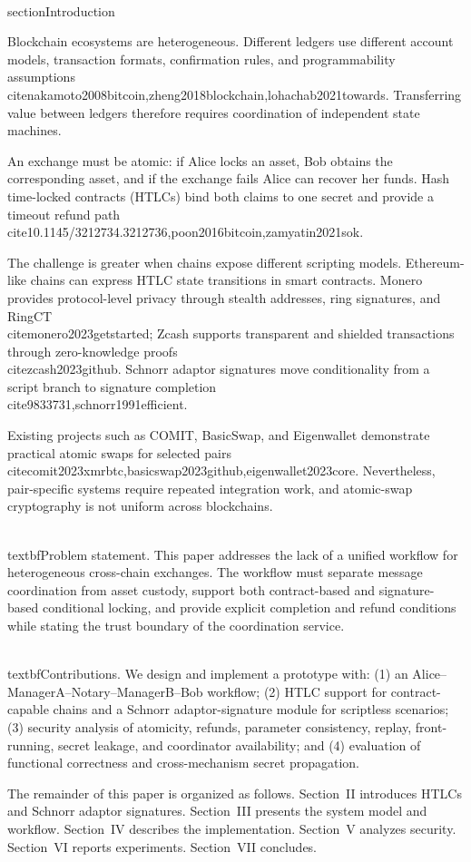 \\section{Introduction}

Blockchain ecosystems are heterogeneous. Different ledgers use different account models, transaction formats, confirmation rules, and programmability assumptions~\\cite{nakamoto2008bitcoin,zheng2018blockchain,lohachab2021towards}. Transferring value between ledgers therefore requires coordination of independent state machines.

An exchange must be atomic: if Alice locks an asset, Bob obtains the corresponding asset, and if the exchange fails Alice can recover her funds. Hash time-locked contracts (HTLCs) bind both claims to one secret and provide a timeout refund path~\\cite{10.1145/3212734.3212736,poon2016bitcoin,zamyatin2021sok}.

The challenge is greater when chains expose different scripting models. Ethereum-like chains can express HTLC state transitions in smart contracts. Monero provides protocol-level privacy through stealth addresses, ring signatures, and RingCT~\\cite{monero2023getstarted}; Zcash supports transparent and shielded transactions through zero-knowledge proofs~\\cite{zcash2023github}. Schnorr adaptor signatures move conditionality from a script branch to signature completion~\\cite{9833731,schnorr1991efficient}.

Existing projects such as COMIT, BasicSwap, and Eigenwallet demonstrate practical atomic swaps for selected pairs~\\cite{comit2023xmrbtc,basicswap2023github,eigenwallet2023core}. Nevertheless, pair-specific systems require repeated integration work, and atomic-swap cryptography is not uniform across blockchains.

\\textbf{Problem statement.} This paper addresses the lack of a unified workflow for heterogeneous cross-chain exchanges. The workflow must separate message coordination from asset custody, support both contract-based and signature-based conditional locking, and provide explicit completion and refund conditions while stating the trust boundary of the coordination service.

\\textbf{Contributions.} We design and implement a prototype with: (1) an Alice--ManagerA--Notary--ManagerB--Bob workflow; (2) HTLC support for contract-capable chains and a Schnorr adaptor-signature module for scriptless scenarios; (3) security analysis of atomicity, refunds, parameter consistency, replay, front-running, secret leakage, and coordinator availability; and (4) evaluation of functional correctness and cross-mechanism secret propagation.

The remainder of this paper is organized as follows. Section~II introduces HTLCs and Schnorr adaptor signatures. Section~III presents the system model and workflow. Section~IV describes the implementation. Section~V analyzes security. Section~VI reports experiments. Section~VII concludes.
